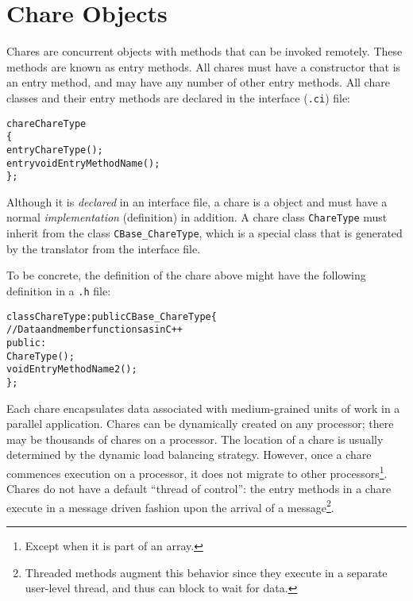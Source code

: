\section{Chare Objects}

Chares are concurrent objects with methods that can be invoked
remotely. These methods are known as entry methods. All
chares must have a constructor that is an entry method, and may have any
number of other entry methods. All chare classes and their entry methods are
declared in the interface (\texttt{.ci}) file:

\begin{alltt}
    chare ChareType
    \{
        entry ChareType();
        entry void EntryMethodName();
    \};
\end{alltt}

Although it is {\em declared} in an interface file, a chare is a \CC{} object and must
have a normal \CC{} {\em implementation} (definition) in addition. A chare
class {\tt ChareType} must inherit from the class {\tt CBase\_ChareType}, which
is a special class that is generated by the \charmpp translator from the
interface file.

To be concrete, the \CC{} definition of the chare above might have 
the following definition in a \texttt{.h} file:

\begin{alltt}
   class ChareType : public CBase\_ChareType \{
       // Data and member functions as in C++
       public:
           ChareType();
           void EntryMethodName2();
   \};
\end{alltt}

Each chare encapsulates data associated with medium-grained units of work in a
parallel application.
Chares can be dynamically created on any processor; there may
be thousands of chares on a processor. The location of a chare is
usually determined by the dynamic load balancing strategy. However,
once a chare commences execution on a processor, it does not migrate
to other processors\footnote{Except when it is part of an array.}.  
Chares do not have a default ``thread of
control'': the entry methods  in a
chare execute in a message driven fashion upon the arrival of a 
message\footnote{Threaded methods augment this behavior since they execute in
a separate user-level thread, and thus can block to wait for data.}.


